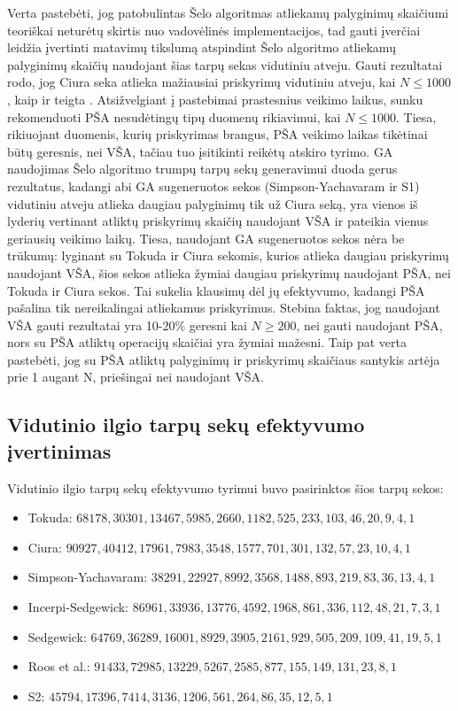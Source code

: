 \documentclass{VUMIFInfKursinis}
\begin{document}
Verta pastebėti, jog patobulintas Šelo algoritmas atliekamų palyginimų skaičiumi teoriškai neturėtų skirtis nuo vadovėlinės implementacijos,
tad gauti įverčiai leidžia įvertinti matavimų tikslumą atspindint Šelo algoritmo atliekamų palyginimų skaičių naudojant šias tarpų sekas vidutiniu atveju.
Gauti rezultatai rodo, jog Ciura seka atlieka mažiausiai priskyrimų vidutiniu atveju, kai $N \leq 1000$, kaip ir teigta \cite{ciura2001best}.
Atsižvelgiant į pastebimai prastesnius veikimo laikus, sunku rekomenduoti PŠA nesudėtingų tipų duomenų rikiavimui, kai $N \leq 1000$.
Tiesa, rikiuojant duomenis, kurių priskyrimas brangus, PŠA veikimo laikas tikėtinai būtų geresnis, nei VŠA, tačiau tuo įsitikinti reikėtų atskiro tyrimo.  
GA naudojimas Šelo algoritmo trumpų tarpų sekų generavimui duoda gerus rezultatus, kadangi abi GA sugeneruotos sekos (Simpson-Yachavaram ir S1)
vidutiniu atveju atlieka daugiau palyginimų tik už Ciura seką, yra vienos iš lyderių vertinant atliktų priskyrimų skaičių naudojant VŠA ir pateikia vienus geriausių veikimo laikų.
Tiesa, naudojant GA sugeneruotos sekos nėra be trūkumų: lyginant su Tokuda ir Ciura sekomis, kurios atlieka daugiau priskyrimų naudojant VŠA, šios sekos atlieka žymiai daugiau priskyrimų
naudojant PŠA, nei Tokuda ir Ciura sekos. Tai sukelia klausimų dėl jų efektyvumo, kadangi PŠA pašalina tik nereikalingai atliekamus priskyrimus.
Stebina faktas, jog naudojant VŠA gauti rezultatai yra 10-20\% geresni kai $N \geq 200$, nei gauti
naudojant PŠA, nors su PŠA atliktų operacijų skaičiai yra žymiai mažesni.
Taip pat verta pastebėti, jog su PŠA atliktų palyginimų ir priskyrimų skaičiaus santykis artėja prie 1 augant N, priešingai nei naudojant VŠA.

\subsection{Vidutinio ilgio tarpų sekų efektyvumo įvertinimas}

Vidutinio ilgio tarpų sekų efektyvumo tyrimui buvo pasirinktos šios tarpų sekos:
\begin{itemize}
  \item Tokuda: $68178,30301,13467,5985,2660,1182,525,233,103,46,20,9,4,1$ \cite{10.5555/645569.659879}
  \item Ciura: $90927,40412,17961,7983,3548,1577,701,301,132,57,23,10,4,1$ \cite{ciura2001best}
  \item Simpson-Yachavaram: $38291,22927,8992,3568,1488,893,219,83,36,13,4,1$ \cite{simpson1999faster}
  \item Incerpi-Sedgewick: $86961,33936,13776,4592,1968,861,336,112,48,21,7,3,1$ \cite{incerpi1985improved}
  \item Sedgewick: $64769,36289,16001,8929,3905,2161,929,505,209,109,41,19,5,1$ \cite{SEDGEWICK1986159}
  \item Roos et al.: $91433,72985,13229,5267,2585,877,155,149,131,23,8,1$ \cite{roos2002genetic}
  \item S2: $45794,17396,7414,3136,1206,561,264,86,35,12,5,1$
\end{itemize}
\end{document}
